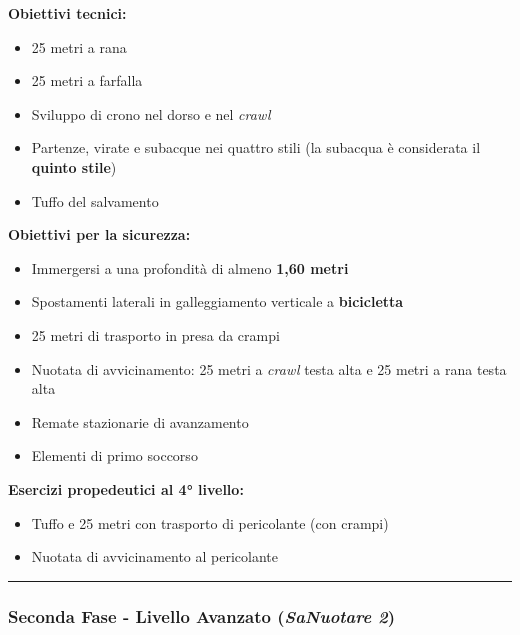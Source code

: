 \documentclass[a4paper,11pt]{article}
\providecommand{\tightlist}{%
  \setlength{\itemsep}{0pt}\setlength{\parskip}{0pt}}
\begin{document}
\textbf{Obiettivi tecnici:}

\begin{itemize}
      \tightlist
      \item
            25 metri a rana
      \item
            25 metri a farfalla
      \item
            Sviluppo di crono nel dorso e nel \emph{crawl}
      \item
            Partenze, virate e subacque nei quattro stili (la subacqua è
            considerata il \textbf{quinto stile})
      \item
            Tuffo del salvamento
\end{itemize}

\textbf{Obiettivi per la sicurezza:}

\begin{itemize}
      \tightlist
      \item
            Immergersi a una profondità di almeno \textbf{1,60 metri}
      \item
            Spostamenti laterali in galleggiamento verticale a \textbf{bicicletta}
      \item
            25 metri di trasporto in presa da crampi
      \item
            Nuotata di avvicinamento: 25 metri a \emph{crawl} testa alta e 25
            metri a rana testa alta
      \item
            Remate stazionarie di avanzamento
      \item
            Elementi di primo soccorso
\end{itemize}

\textbf{Esercizi propedeutici al 4° livello:}

\begin{itemize}
      \tightlist
      \item
            Tuffo e 25 metri con trasporto di pericolante (con crampi)
      \item
            Nuotata di avvicinamento al pericolante
\end{itemize}

\begin{center}\rule{0.5\linewidth}{0.5pt}\end{center}

\subsubsection{\texorpdfstring{Seconda Fase - Livello Avanzato
            (\emph{SaNuotare
                  2})}{Seconda Fase - Livello Avanzato (SaNuotare 2)}}\label{seconda-fase---livello-avanzato-sanuotare-2}
\end{document}
